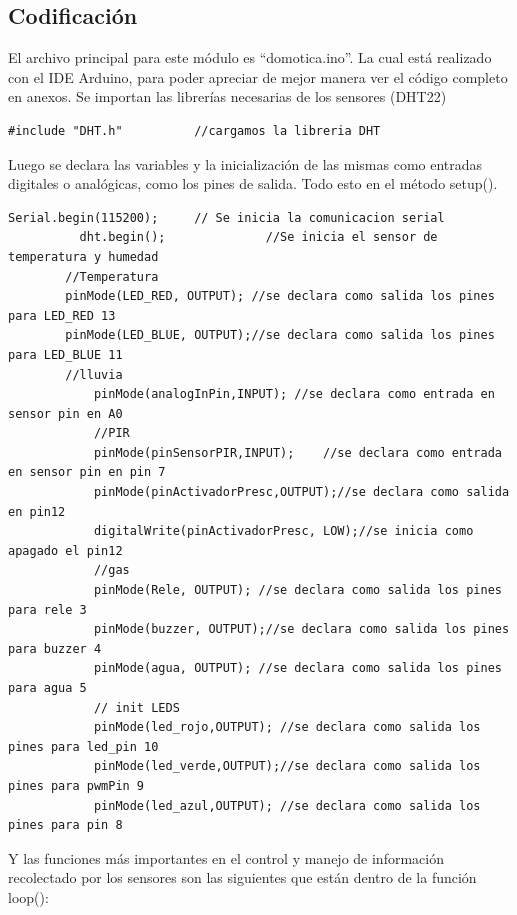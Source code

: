 \documentclass[11pt,letterpaper]{report}
\begin{document}
		
		
	\subsection{Codificación}
	El archivo principal para este módulo es “domotica.ino”. La  cual está realizado con el IDE Arduino, para poder apreciar  de mejor manera  ver el código completo en anexos.
Se importan las librerías necesarias de los sensores (DHT22)
		\begin{lstlisting}[language=Arduino]
			#include "DHT.h"          //cargamos la libreria DHT
		\end{lstlisting}
Luego se declara las variables y la inicialización de las mismas  como entradas digitales o analógicas, como los pines de salida. Todo esto en el método setup().
		\begin{lstlisting}[language=Arduino]
			Serial.begin(115200);     // Se inicia la comunicacion serial
		  dht.begin();              //Se inicia el sensor de temperatura y humedad
  		//Temperatura
  		pinMode(LED_RED, OUTPUT); //se declara como salida los pines para LED_RED 13
  		pinMode(LED_BLUE, OUTPUT);//se declara como salida los pines para LED_BLUE 11
  		//lluvia
  			pinMode(analogInPin,INPUT); //se declara como entrada en sensor pin en A0
  			//PIR
  			pinMode(pinSensorPIR,INPUT);    //se declara como entrada en sensor pin en pin 7
  			pinMode(pinActivadorPresc,OUTPUT);//se declara como salida en pin12
  			digitalWrite(pinActivadorPresc, LOW);//se inicia como apagado el pin12
  			//gas
  			pinMode(Rele, OUTPUT); //se declara como salida los pines para rele 3
  			pinMode(buzzer, OUTPUT);//se declara como salida los pines para buzzer 4
  			pinMode(agua, OUTPUT); //se declara como salida los pines para agua 5
  			// init LEDS
  			pinMode(led_rojo,OUTPUT); //se declara como salida los pines para led_pin 10
  			pinMode(led_verde,OUTPUT);//se declara como salida los pines para pwmPin 9
  			pinMode(led_azul,OUTPUT); //se declara como salida los pines para pin 8
		\end{lstlisting}
Y las funciones más importantes en el control y manejo de información recolectado por los sensores son las siguientes que están dentro de la función loop():
\end{document}
